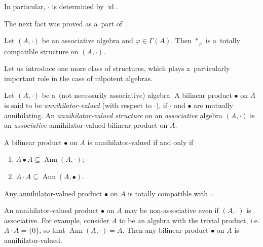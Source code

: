 \documentclass{jonasart}
\newcommand{\bl}{\bullet}
\newcommand{\G}{\Gamma}
\newcommand{\sst}{\subseteq}
\newcommand{\vf}{\varphi}
\DeclareMathOperator{\Ann}{Ann}
\DeclareMathOperator{\id}{id}
\begin{document}
	\begin{remark}
		In particular, $\cdot$ is determined by $\id$.
	\end{remark}
	The next fact was proved as a~part of~\cite[Lemma 2.3]{Khr2024}.
	\begin{lemma}\label{*_v f-tot-comp-with-cdot}
		Let $(A,\cdot)$ be an associative algebra and $\vf\in\G(A)$. Then $*_\vf$
		is a~totally compatible structure on $(A,\cdot)$.
	\end{lemma}
	Let us introduce one more class of structures, which plays a~particularly important role in the case of nilpotent algebras.
	\begin{definition}
		Let $(A,\cdot)$ be a~(not necessarily associative) algebra. A bilinear product $\bl$ on $A$ is said to be \textit{annihilator-valued} (with respect to $\cdot$), if $\cdot$ and $\bl$ are mutually annihilating. An \textit{annihilator-valued structure} on an \textit{associative} algebra $(A,\cdot)$ is an \textit{associative} annihilator-valued bilinear product on $A$.
	\end{definition}

	\begin{remark}\label{ann-val-equiv-descr}
		A bilinear product $\bl$ on $A$ is annihilator-valued if and only if
		\begin{enumerate}
			\item\label{A-bl-A-sst-Ann(A)} $A\bl A\sst\Ann(A,\cdot)$;
			\item\label{(A-cdot-A)-bl-A=A-bl-(A-cdot-A)=0} $A\cdot A\sst\Ann(A,\bl)$.
		\end{enumerate}
	\end{remark}

	\begin{remark}\label{cdot-and-bl-mut-ann}
		Any annihilator-valued product $\bl$ on $A$ is totally compatible with $\cdot$.
	\end{remark}

	\begin{remark}\label{null-algebra-tot-comp}
		An annihilator-valued product $\bl$ on $A$ may be non-associative even if $(A,\cdot)$ is associative. For example, consider $A$ to be an algebra with the trivial product, i.e. $A\cdot A=\{0\}$, so that $\Ann(A,\cdot)=A$. Then any bilinear product $\bl$ on $A$ is annihilator-valued.
	\end{remark}
\end{document}
